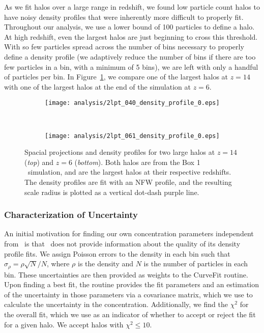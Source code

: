As we fit halos over a large range in redshift, we found low particle count halos to have noisy density profiles that were inherently more difficult to properly fit.  Throughout our analysis, we use a lower bound of 100 particles to define a halo.  At high redshift, even the largest halos are just beginning to cross this threshold.  With so few particles spread across the number of bins necessary to properly define a density profile (we adaptively reduce the number of bins if there are too few particles in a bin, with a minimum of 5 bins), we are left with only a handful of particles per bin.  In Figure~\ref{fig:fitting--density_profiles}, we compare one of the largest halos at $z = 14$ with one of the largest halos at the end of the simulation at $z = 6$.

\begin{figure}[tp]
	\centering
	\begin{subfigure}{}
		\texttt{[image: analysis/2lpt\_040\_density\_profile\_0.eps]}
	\end{subfigure}
	\\
	\begin{subfigure}{}
		\texttt{[image: analysis/2lpt\_061\_density\_profile\_0.eps]}
	\end{subfigure}
	\caption[Density profiles for two large halos at $z = 14$ and $z = 6$.]{\footnotesize Spacial projections and density profiles for two large halos at $z = 14$ (\emph{top}) and $z = 6$ (\emph{bottom}).  Both halos are from the Box 1 \lpt\ simulation, and are the largest halos at their respective redshifts.  The density profiles are fit with an NFW profile, and the resulting scale radius is plotted as a vertical dot-dash purple line.}
	\label{fig:fitting--density_profiles}
\end{figure}



\subsubsection{Characterization of Uncertainty}
\label{subsubsec:analysis--profile_fitting--uncertainty}


An initial motivation for finding our own concentration parameters independent from \rockstar\ is that \rockstar\ does not provide information about the quality of its density profile fits.  We assign Poisson errors to the density in each bin such that $\sigma_{\rho} = \rho \sqrt{N} / N$, where $\rho$ is the density and $N$ is the number of particles in each bin.  These uncertainties are then provided as weights to the CurveFit routine.  Upon finding a best fit, the routine provides the fit parameters and an estimation of the uncertainty in those parameters via a covariance matrix, which we use to calculate the uncertainty in the concentration.  Additionally, we find the $\chi^{2}$ for the overall fit, which we use as an indicator of whether to accept or reject the fit for a given halo.  We accept halos with $\chi^{2} \le 10$.



